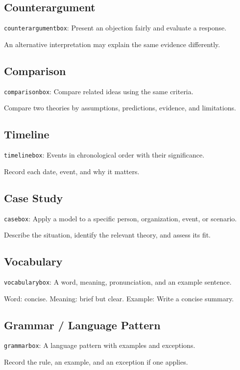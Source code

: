 \documentclass[11pt]{article}
\begin{document}
\subsection{Counterargument}
{\small\texttt{counterargumentbox}: Present an objection fairly and evaluate a response.}
\begin{counterargumentbox}
An alternative interpretation may explain the same evidence differently.
\end{counterargumentbox}
\subsection{Comparison}
{\small\texttt{comparisonbox}: Compare related ideas using the same criteria.}
\begin{comparisonbox}
Compare two theories by assumptions, predictions, evidence, and limitations.
\end{comparisonbox}
\subsection{Timeline}
{\small\texttt{timelinebox}: Events in chronological order with their significance.}
\begin{timelinebox}
Record each date, event, and why it matters.
\end{timelinebox}
\subsection{Case Study}
{\small\texttt{casebox}: Apply a model to a specific person, organization, event, or scenario.}
\begin{casebox}
Describe the situation, identify the relevant theory, and assess its fit.
\end{casebox}
\subsection{Vocabulary}
{\small\texttt{vocabularybox}: A word, meaning, pronunciation, and an example sentence.}
\begin{vocabularybox}
Word: concise. Meaning: brief but clear. Example: Write a concise summary.
\end{vocabularybox}
\subsection{Grammar / Language Pattern}
{\small\texttt{grammarbox}: A language pattern with examples and exceptions.}
\begin{grammarbox}
Record the rule, an example, and an exception if one applies.
\end{grammarbox}
\end{document}
